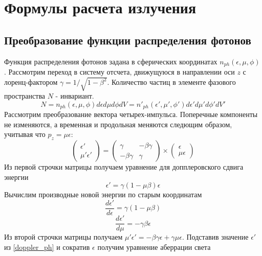 \chapter{Формулы расчета излучения}\label{Formulae}

\section{Преобразование функции распределения фотонов}
Функция распределения фотонов задана в сферических координатах $n_{ph}(\epsilon,\mu,\phi)$. Рассмотрим переход в систему отсчета, движущуюся в направлении оси $z$ с лоренц-фактором $\gamma = 1/\sqrt{1-\beta^2}$. Количество частиц в элементе фазового пространства $N$ - инвариант.
\begin{equation}
	N = n_{ph}(\epsilon,\mu,\phi)d\epsilon d\mu d\phi dV = n'_{ph}(\epsilon',\mu',\phi')d\epsilon' d\mu' d\phi' dV'
\end{equation}
Рассмотрим преобразование вектора четырех-импульса. Поперечные компоненты не изменяются, а временная и продольная меняются следющим образом, учитывая что $p_z = \mu \epsilon$:
\begin{equation}\label{lorentz_ph}
	\left(\begin{array}{c}
		\epsilon'\\
		\mu'\epsilon'
	\end{array}
	\right)
	= \left(
	\begin{array}{cc}
		\gamma & -\beta\gamma\\
		-\beta\gamma & \gamma
	\end{array}
	\right)
	\times
	\left(\begin{array}{c}
		\epsilon\\
		\mu\epsilon
	\end{array}
	\right)
\end{equation}
Из первой строчки матрицы получаем уравнение для допплеровского сдвига энергии
\begin{equation}\label{doppler_ph}
	\epsilon'=\gamma(1-\mu\beta)\epsilon
\end{equation}
Вычислим производные новой энергии по старым координатам
\begin{equation}
	\frac{d\epsilon'}{d\epsilon}=\gamma(1-\mu\beta)
\end{equation}
\begin{equation}
	\frac{d\epsilon'}{d\mu}=-\gamma\beta\epsilon
\end{equation}
Из второй строчки матрицы получаем $\mu'\epsilon'=-\beta\gamma\epsilon+\gamma\mu\epsilon$. Подставив значение $\epsilon'$ из \ref{doppler_ph} и сократив $\epsilon$ получим уравнение аберрации света
